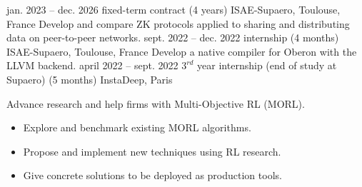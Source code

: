 \documentclass[
    a4paper,
]{fortysecondscv}
\begin{document}
    \makefrontsidebar


        \begin{cvtable}[4]
            \cvitem
                {jan. 2023 -- dec. 2026}
                {fixed-term contract \newline (4 years)}
                {ISAE-Supaero, Toulouse, France}
                {
                    Develop and compare ZK protocols applied to sharing and distributing data on peer-to-peer networks.
                }
            \cvitem
                {sept. 2022 -- dec. 2022}
                {internship \newline (4 months)}
                {ISAE-Supaero, Toulouse, France}
                {
                    Develop a native compiler for Oberon with the LLVM backend.
                }
            \cvitem
                {april 2022 -- sept. 2022}
                {$3^{rd}$ year internship (end of study at Supaero) \newline (5 months)}
                {InstaDeep, Paris}
                {
                    Advance research and help firms with Multi-Objective RL (MORL).
                    \begin{itemize}
                        \item Explore and benchmark existing MORL algorithms.
                        \item Propose and implement new techniques using RL research.
                        \item Give concrete solutions to be deployed as production tools.
                    \end{itemize}
}
\end{cvtable}
\end{document}
